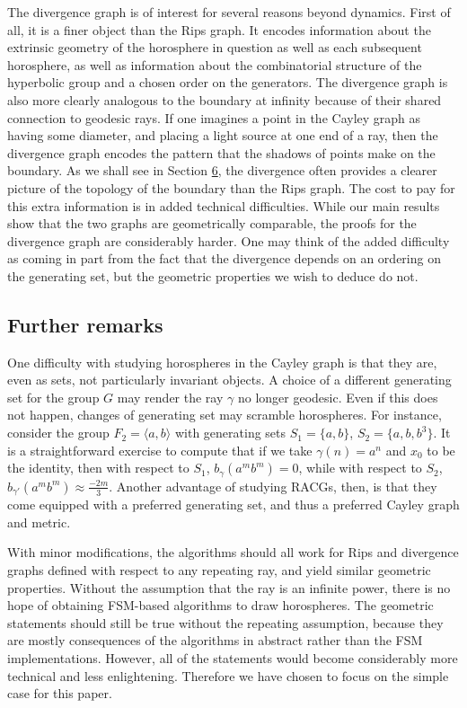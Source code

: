 \documentclass[10pt,a4paper]{amsart}
\theoremstyle{definition}
\theoremstyle{remark}
\begin{document}
    The divergence graph is of interest for several reasons beyond dynamics. First of all, it is a finer object than the Rips graph. It encodes information about the extrinsic geometry of the horosphere in question as well as each subsequent horosphere, as well as information about the combinatorial structure of the hyperbolic group and a chosen order on the generators. The divergence graph is also more clearly analogous to the boundary at infinity because of their shared connection to geodesic rays. If one imagines a point in the Cayley graph as having some diameter, and placing a light source at one end of a ray, then the divergence graph encodes the pattern that the shadows of points make on the boundary. As we shall see in Section \href{https://arxiv.org/abs/2406.18774v2}{6}, the divergence often provides a clearer picture of the topology of the boundary than the Rips graph. The cost to pay for this extra information is in added technical difficulties. While our main results show that the two graphs are geometrically comparable, the proofs for the divergence graph are considerably harder. One may think of the added difficulty as coming in part from the fact that the divergence depends on an ordering on the generating set, but the geometric properties we wish to deduce do not.
	
    \subsection*{Further remarks}
    
    One difficulty with studying horospheres in the Cayley graph is that they are, even as sets, not particularly invariant objects. A choice of a different generating set for the group $G$ may render the ray $\gamma$ no longer geodesic. Even if this does not happen, changes of generating set may scramble horospheres. For instance, consider the group $F_2=\langle a, b\rangle$ with generating sets $S_1=\{a,b\}$, $S_2=\{a, b, b^3\}$. It is a straightforward exercise to compute that if we take $\gamma(n)=a^n$ and $x_0$ to be the identity, then with respect to $S_1$, $b_\gamma(a^mb^m)=0$, while with respect to $S_2$, $b_{\gamma'}(a^mb^m)\approx \frac{-2m}{3}$. Another advantage of studying RACGs, then, is that they come equipped with a preferred generating set, and thus a preferred Cayley graph and metric.
	
	With minor modifications, the algorithms should all work for Rips and divergence graphs defined with respect to any repeating ray, and yield similar geometric properties. Without the assumption that the ray is an infinite power, there is no hope of obtaining FSM-based algorithms to draw horospheres. The geometric statements should still be true without the repeating assumption, because they are mostly consequences of the algorithms in abstract rather than the FSM implementations. However, all of the statements would become considerably more technical and less enlightening. Therefore we have chosen to focus on the simple case for this paper.
	
\end{document}
